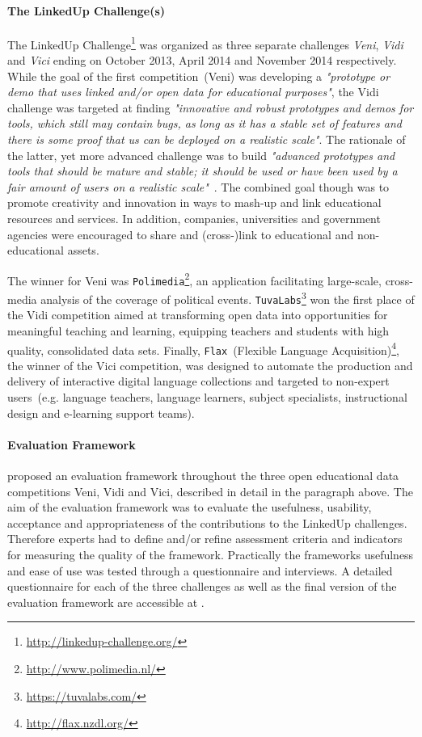\documentclass{article}
\begin{document}
\paragraph{The LinkedUp Challenge(s)}
The LinkedUp Challenge\footnote{\url{http://linkedup-challenge.org/}} was organized as three separate challenges \textit{Veni}, \textit{Vidi} and \textit{Vici} ending on October 2013, April 2014 and November 2014 respectively. While the goal of the first competition~(Veni) was developing a \textit{"prototype or demo that uses linked and/or open data for educational purposes"}, the Vidi challenge was targeted at finding \textit{"innovative and robust prototypes and demos for tools, which still may contain bugs, as long as it has a stable set of features and there is some proof that us can be deployed on a realistic scale"}. The rationale of the latter, yet more advanced challenge was to build \textit{"advanced prototypes and tools that should be mature and stable; it should be used or have been used by a fair amount of users on a realistic scale"}~\cite{url:linkedup_lnikedup_challenge_results}. 
The combined goal though was to promote creativity and innovation in ways to mash-up and link educational resources and services. In addition, companies, universities and government agencies were encouraged to share and (cross-)link to educational and non-educational assets. 

The winner for Veni was \texttt{Polimedia}\footnote{\url{http://www.polimedia.nl/}}, an application facilitating large-scale, cross-media analysis of the coverage of political events.
\texttt{TuvaLabs}\footnote{\url{https://tuvalabs.com/}} won the first place of the Vidi competition aimed at transforming open data into opportunities for meaningful teaching and learning, equipping teachers and students with high quality, consolidated data sets. Finally, \texttt{Flax}~(Flexible Language Acquisition)\footnote{\url{http://flax.nzdl.org/}},
the winner of the Vici competition, was designed to automate the production and delivery of interactive digital language collections and targeted to non-expert users~(e.g. language teachers, language learners, subject specialists, instructional design and e-learning support teams). 

\paragraph{Evaluation Framework}
\citet{url:linkedup_evaluation_framework} proposed an evaluation framework throughout the three open educational data competitions Veni, Vidi and Vici, described in detail in the paragraph above. The aim of the evaluation framework was to evaluate the usefulness, usability, acceptance and appropriateness of the contributions to the LinkedUp challenges. Therefore experts had to define and/or refine assessment criteria and indicators for measuring the quality of the framework. Practically the frameworks usefulness and ease of use was tested through a questionnaire and interviews. A detailed questionnaire for each of the three challenges as well as the final version of the evaluation framework are accessible at \cite{url:linkedup_evaluation_framework}. 
\end{document}
